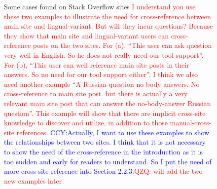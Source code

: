 \begin{figure}
	\centering
	\hfill
	\caption{Some cases found on Stack Overflow sites \textcolor{red}{I understand you use these two examples to illustrate the need for cross-reference between main site and lingual-variant. But will they incur questions? Because they show that main site and lingual-variant users can cross-reference posts on the two sites. For (a), ``This user can ask question very well in English. So he does not really need our tool support''. For (b), ``This user can well reference main site posts in their answers. So no need for our tool support either''. I think we also need another example ``A Russian question no body answers. No cross-reference to main site post. but there is actually a very relevant main site post that can answer the no-body-answer Russian question''. This example will show that there are implicit cross-site knowledge to discover and utilize, in addition to those manual-cross-site references.} \textcolor{blue}{CCY:Actually, I want to use these examples to show the relationships between two sites. I think that it is not necessary to show the need of the cross-reference in the introduction as it is too sudden and early for readers to understand. So I put the need of more cross-site reference into Section 2.2.3.}\textcolor{red}{QZQ: will add the two new examples later}}
	\label{fig:linkPair}
\end{figure}


